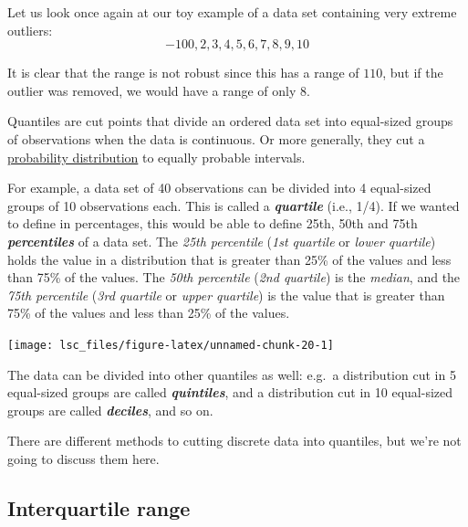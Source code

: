 \documentclass[
  11pt,
  a4paper,
  twoside,symmetric,openright]{book}
\theoremstyle{break}
\theoremstyle{break}
\begin{document}
\begin{example}
\protect\hypertarget{exm:exrange2}{}\label{exm:exrange2}Let us look once again at our toy example of a data set containing very extreme outliers:
\[
-100,2,3,4,5,6,7,8,9,10
\]

It is clear that the range is not robust since this has a range of \(110\), but if the outlier was removed, we would have a range of only \(8\).
\end{example}

\hypertarget{calloutquantile}{}
\begin{callout}[Quantiles]

Quantiles are cut points that divide an ordered data set into equal-sized groups of observations when the data is continuous. Or more generally, they cut a \protect\hyperlink{probability}{probability distribution} to equally probable intervals.

For example, a data set of 40 observations can be divided into 4 equal-sized groups of 10 observations each. This is called a \textbf{\emph{quartile}} (i.e., 1/4). If we wanted to define in percentages, this would be able to define 25th, 50th and 75th \textbf{\emph{percentiles}} of a data set. The \emph{25th percentile} (\emph{1st quartile} or \emph{lower quartile}) holds the value in a distribution that is greater than 25\% of the values and less than 75\% of the values. The \emph{50th percentile} (\emph{2nd quartile}) is the \emph{median}, and the \emph{75th percentile} (\emph{3rd quartile} or \emph{upper quartile}) is the value that is greater than 75\% of the values and less than 25\% of the values.

\begin{center}\texttt{[image: lsc\_files/figure-latex/unnamed-chunk-20-1]} \end{center}

The data can be divided into other quantiles as well: e.g.~a distribution cut in 5 equal-sized groups are called \textbf{\emph{quintiles}}, and a distribution cut in 10 equal-sized groups are called \textbf{\emph{deciles}}, and so on.

There are different methods to cutting discrete data into quantiles, but we're not going to discuss them here.

\end{callout}

\hypertarget{IQR}{%
\subsection{Interquartile range}\label{IQR}}
\end{document}

